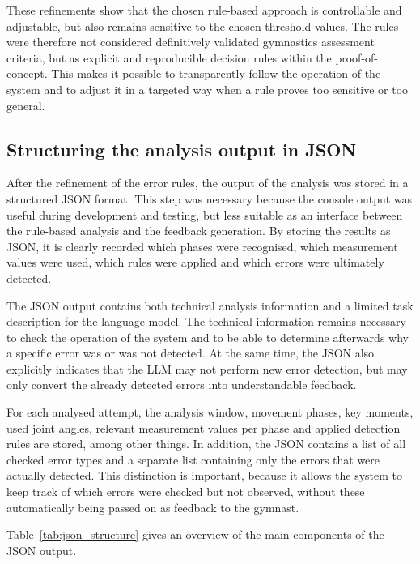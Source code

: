 These refinements show that the chosen rule-based approach is controllable and adjustable, but also remains sensitive to the chosen threshold values. The rules were therefore not considered definitively validated gymnastics assessment criteria, but as explicit and reproducible decision rules within the proof-of-concept. This makes it possible to transparently follow the operation of the system and to adjust it in a targeted way when a rule proves too sensitive or too general.

\subsection{Structuring the analysis output in JSON}

After the refinement of the error rules, the output of the analysis was stored in a structured JSON format. This step was necessary because the console output was useful during development and testing, but less suitable as an interface between the rule-based analysis and the feedback generation. By storing the results as JSON, it is clearly recorded which phases were recognised, which measurement values were used, which rules were applied and which errors were ultimately detected.

The JSON output contains both technical analysis information and a limited task description for the language model. The technical information remains necessary to check the operation of the system and to be able to determine afterwards why a specific error was or was not detected. At the same time, the JSON also explicitly indicates that the LLM may not perform new error detection, but may only convert the already detected errors into understandable feedback.

For each analysed attempt, the analysis window, movement phases, key moments, used joint angles, relevant measurement values per phase and applied detection rules are stored, among other things. In addition, the JSON contains a list of all checked error types and a separate list containing only the errors that were actually detected. This distinction is important, because it allows the system to keep track of which errors were checked but not observed, without these automatically being passed on as feedback to the gymnast.

Table~\ref{tab:json_structure} gives an overview of the main components of the JSON output.

